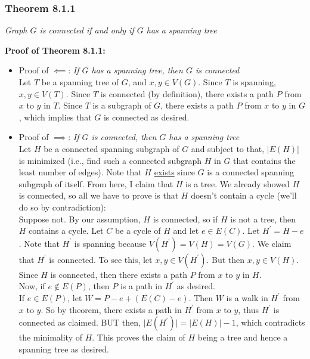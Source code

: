 \documentclass{report}
\begin{document}
\subsubsection{Theorem 8.1.1}
\begin{center}
\textit{Graph $G$ is connected if and only if $G$ has a spanning tree}
\end{center}
\textbf{Proof of Theorem 8.1.1:}
\begin{itemize}
\item Proof of $\impliedby$: \textit{If $G$ has a spanning tree, then $G$ is connected}\\
Let $T$ be a spanning tree of $G$, and $x,y \in V(G)$. Since $T$ is spanning, $x,y\in V(T)$. Since $T$ is connected (by definition), there exists a path $P$ from $x$ to $y$ in $T$. Since $T$ is a subgraph of $G$, there exists a path $P$ from $x$ to $y$ in $G$, which implies that $G$ is connected as desired.
\item 
Proof of $\implies$: \textit{If $G$ is connected, then $G$ has a spanning tree}\\
Let $H$ be a connected spanning subgraph of $G$ and subject to that, $\vert E(H) \vert$ is minimized (i.e., find such a connected subgraph $H$ in $G$ that contains the least number of edges). Note that $H$ \underline{exists} since $G$ is a connected spanning subgraph of itself.
\newpage From here, I claim that $H$ is a tree. We already showed $H$ is connected, so all we have to prove is that $H$ doesn't contain a cycle (we'll do so by contradiction):\\
Suppose not. By our assumption, $H$ is connected, so if $H$ is not a tree, then $H$ contains a cycle. Let $C$ be a cycle of $H$ and let $e \in E(C)$. Let $H^\prime = H-e$. Note that $H^\prime$ is spanning because $V(H^\prime) = V(H) = V(G)$. We claim that $H^\prime$ is connected. To see this, let $x,y \in V(H^\prime)$. But then $x,y \in V(H)$. Since $H$ is connected, then there exists a path $P$ from $x$ to $y$ in $H$.\\
Now, if $e \not\in E(P)$, then $P$ is a path in $H^\prime$ as desired.\\
If $e \in E(P)$, let $W = P-e + (E(C) - e)$. Then $W$ is a walk in $H^\prime$ from $x$ to $y$. So by theorem, there exists a path in $H^\prime$ from $x$ to $y$, thus $H^\prime$ is connected as claimed. BUT then, $\vert E(H^\prime) \vert = \vert E(H) \vert - 1$, which contradicts the minimality of $H$. This proves the claim of $H$ being a tree and hence a spanning tree as desired.

\end{itemize}
\end{document}
